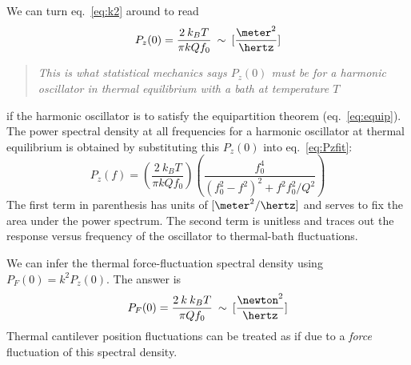 We can turn eq.~\ref{eq:k2} around to read
\begin{equation}
P_z(0) = \frac{2 \: k_B T}{\pi k Q f_0} \: \sim \: [\frac{\meter^2}{\hertz}]
\end{equation}
\begin{quote}
   \emph{This is what statistical mechanics says $P_z(0)$ must be for
   a harmonic oscillator in thermal equilibrium with a bath at
   temperature $T$}
\end{quote}
if the harmonic oscillator is to satisfy the equipartition theorem
(eq.~\ref{eq:equip}).  The power spectral density at all frequencies
for a harmonic oscillator at thermal equilibrium is obtained by
substituting this $P_z(0)$ into eq.~\ref{eq:Pzfit}:
\begin{equation}
P_z(f) =  (\frac{2 \: k_B T}{\pi k Q f_0})(\frac{f_0^4}{(f_0^2 - f^2)^2 + f^2 f_0^2 / Q^2})
\end{equation}
The first term in parenthesis has units of $[\meter^2/\hertz]$ and
serves to fix the area under the power spectrum.  The second term is
unitless and traces out the response versus frequency of the
oscillator to thermal-bath fluctuations.

We can infer the thermal force-fluctuation spectral density using
$P_F(0) = k^2 P_z(0)$.  The answer is
\begin{equation}
P_F(0) = \frac{2 \: k \: k_B T}{\pi Q f_0} \: \sim \: [\frac{\newton^2}{\hertz}]
\label{eq:PF0}
\end{equation}
Thermal cantilever position fluctuations can be treated as if due to a
\emph{force} fluctuation of this spectral density.


